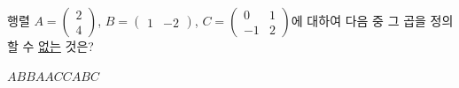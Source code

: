 행렬 $A=\begin{pmatrix} 2 \\ 4 \end{pmatrix}$, $B=\begin{pmatrix} 1 & -2 \end{pmatrix}$, $C=\begin{pmatrix} 0 & 1 \\ -1 & 2 \end{pmatrix}$에 대하여 다음 중 그 곱을 정의할 수 \underline{없는} 것은?
\begin{choices32}{$AB$}{$BA$}{$AC$}{$CA$}{$BC$}\end{choices32}

